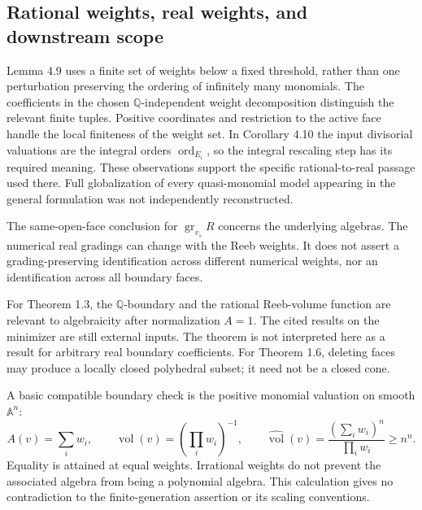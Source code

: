 \documentclass[10pt]{article}
\begin{document}
\subsection*{Rational weights, real weights, and downstream scope}
Lemma 4.9 uses a finite set of weights below a fixed threshold, rather than one perturbation preserving the ordering of infinitely many monomials. The coefficients in the chosen \(\mathbb Q\)-independent weight decomposition distinguish the relevant finite tuples. Positive coordinates and restriction to the active face handle the local finiteness of the weight set. In Corollary 4.10 the input divisorial valuations are the integral orders \(\operatorname{ord}_{E_i}\), so the integral rescaling step has its required meaning. These observations support the specific rational-to-real passage used there. Full globalization of every quasi-monomial model appearing in the general formulation was not independently reconstructed.\par
The same-open-face conclusion for \(\operatorname{gr}_{v_s}R\) concerns the underlying algebras. The numerical real gradings can change with the Reeb weights. It does not assert a grading-preserving identification across different numerical weights, nor an identification across all boundary faces.\par
For Theorem 1.3, the \(\mathbb Q\)-boundary and the rational Reeb-volume function are relevant to algebraicity after normalization \(A=1\). The cited results on the minimizer are still external inputs. The theorem is not interpreted here as a result for arbitrary real boundary coefficients. For Theorem 1.6, deleting faces may produce a locally closed polyhedral subset; it need not be a closed cone.\par
A basic compatible boundary check is the positive monomial valuation on smooth \(\mathbb A^n\): \[A(v)=\sum_iw_i,\qquad \operatorname{vol}(v)=(\prod_iw_i)^{-1},\qquad
 \widehat{\operatorname{vol}}(v)=\frac{(\sum_iw_i)^n}{\prod_iw_i}\geq n^n.\] Equality is attained at equal weights. Irrational weights do not prevent the associated algebra from being a polynomial algebra. This calculation gives no contradiction to the finite-generation assertion or its scaling conventions.\par
\end{document}
